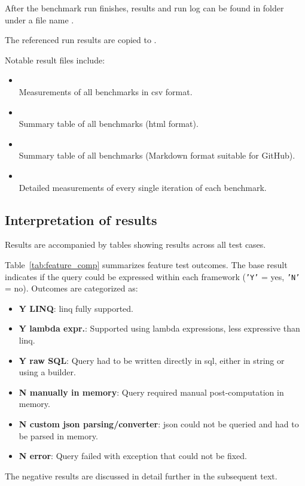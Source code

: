 After the benchmark run finishes, results and run log can be found in folder  under a file name .

\smallskip
The referenced run results are copied to .

\smallskip
Notable result files include:
\begin{itemize}
    \item {}\\
    Measurements of all benchmarks in \acrshort{csv} format.

    \item {}\\
    Summary table of all benchmarks (\acrshort{html} format).

    \item {}\\
    Summary table of all benchmarks (Markdown format suitable for GitHub).

    \item {}\\
    Detailed measurements of every single iteration of each benchmark.
\end{itemize}

\subsection{Interpretation of results}
Results are accompanied by tables showing results across all test cases. 

Table~\ref{tab:feature_comp} summarizes feature test outcomes. The base result indicates if the query could be expressed within each framework (\texttt{'Y'} = yes, \texttt{'N'} = no). Outcomes are categorized as:
\begin{itemize}
    \item \textbf{Y LINQ}: \acrshort{linq} fully supported.
    \item \textbf{Y lambda expr.}: Supported using lambda expressions, less expressive than \acrshort{linq}.
    \item \textbf{Y raw SQL}: Query had to be written directly in \acrshort{sql}, either in string or using a builder.
    \item \textbf{N manually in memory}: Query required manual post-computation in memory.
    \item \textbf{N custom \acrshort{json} parsing/converter}: \acrshort{json} could not be queried and had to be parsed in memory.
    \item \textbf{N error}: Query failed with exception that could not be fixed. 
\end{itemize}
The negative results are discussed in detail further in the subsequent text.

